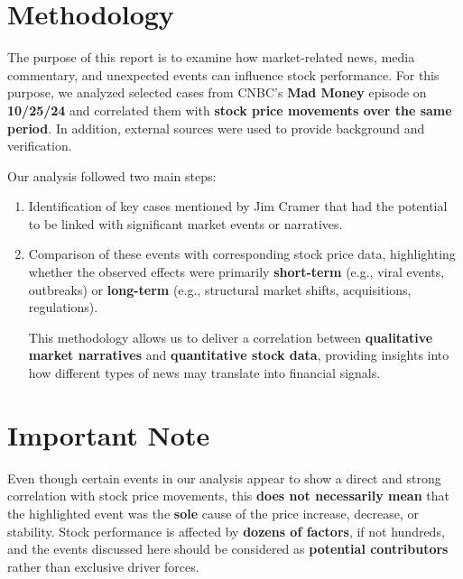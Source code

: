 \documentclass[12pt,a4paper]{article}
\begin{document}
\section*{Methodology}
The purpose of this report is to examine how market-related news, media commentary, 
and unexpected events can influence stock performance. 
For this purpose, we analyzed selected cases from CNBC's \textbf{Mad Money} episode 
on \textbf{10/25/24} and correlated them with \textbf{stock price movements over the same period}. 
In addition, external sources were used to provide background and verification.

\vspace{0.3cm}
Our analysis followed two main steps:
\begin{enumerate}
    \item Identification of key cases mentioned by Jim Cramer that had the potential 
    to be linked with significant market events or narratives.
    \item Comparison of these events with corresponding stock price data, 
    highlighting whether the observed effects were primarily \textbf{short-term} (e.g., viral events, outbreaks) 
    or \textbf{long-term} (e.g., structural market shifts, acquisitions, regulations).
    
    This methodology allows us to deliver a correlation between 
\textbf{qualitative market narratives} and \textbf{quantitative stock data}, 
providing insights into how different types of news may translate into 
financial signals.
\end{enumerate}

\vspace{0.3cm}
\section*{Important Note}
Even though certain events in our analysis appear to show a direct and strong correlation 
with stock price movements, this \textbf{does not necessarily mean} that the highlighted event 
was the \textbf{sole} cause of the price increase, decrease, or stability. 
Stock performance is affected by \textbf{dozens of factors}, if not hundreds, and the events discussed here
should be considered as \textbf{potential contributors} rather than exclusive driver forces.
\vspace{0.3cm}
\end{document}
